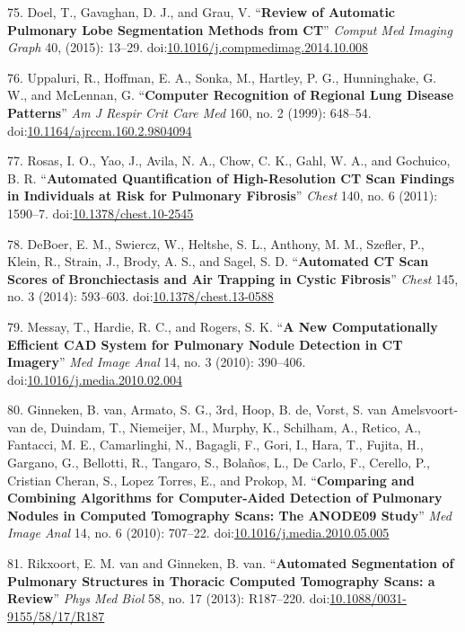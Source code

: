 \documentclass[11pt,]{article}
\begin{document}
75. Doel, T., Gavaghan, D. J., and Grau, V. ``\textbf{Review of
Automatic Pulmonary Lobe Segmentation Methods from CT}'' \emph{Comput
Med Imaging Graph} 40, (2015): 13--29.
doi:\href{http://dx.doi.org/10.1016/j.compmedimag.2014.10.008}{10.1016/j.compmedimag.2014.10.008}

76. Uppaluri, R., Hoffman, E. A., Sonka, M., Hartley, P. G.,
Hunninghake, G. W., and McLennan, G. ``\textbf{Computer Recognition of
Regional Lung Disease Patterns}'' \emph{Am J Respir Crit Care Med} 160,
no. 2 (1999): 648--54.
doi:\href{http://dx.doi.org/10.1164/ajrccm.160.2.9804094}{10.1164/ajrccm.160.2.9804094}

77. Rosas, I. O., Yao, J., Avila, N. A., Chow, C. K., Gahl, W. A., and
Gochuico, B. R. ``\textbf{Automated Quantification of High-Resolution CT
Scan Findings in Individuals at Risk for Pulmonary Fibrosis}''
\emph{Chest} 140, no. 6 (2011): 1590--7.
doi:\href{http://dx.doi.org/10.1378/chest.10-2545}{10.1378/chest.10-2545}

78. DeBoer, E. M., Swiercz, W., Heltshe, S. L., Anthony, M. M., Szefler,
P., Klein, R., Strain, J., Brody, A. S., and Sagel, S. D.
``\textbf{Automated CT Scan Scores of Bronchiectasis and Air Trapping in
Cystic Fibrosis}'' \emph{Chest} 145, no. 3 (2014): 593--603.
doi:\href{http://dx.doi.org/10.1378/chest.13-0588}{10.1378/chest.13-0588}

79. Messay, T., Hardie, R. C., and Rogers, S. K. ``\textbf{A New
Computationally Efficient CAD System for Pulmonary Nodule Detection in
CT Imagery}'' \emph{Med Image Anal} 14, no. 3 (2010): 390--406.
doi:\href{http://dx.doi.org/10.1016/j.media.2010.02.004}{10.1016/j.media.2010.02.004}

80. Ginneken, B. van, Armato, S. G., 3rd, Hoop, B. de, Vorst, S. van
Amelsvoort-van de, Duindam, T., Niemeijer, M., Murphy, K., Schilham, A.,
Retico, A., Fantacci, M. E., Camarlinghi, N., Bagagli, F., Gori, I.,
Hara, T., Fujita, H., Gargano, G., Bellotti, R., Tangaro, S., Bola{ñ}os,
L., De Carlo, F., Cerello, P., Cristian Cheran, S., Lopez Torres, E.,
and Prokop, M. ``\textbf{Comparing and Combining Algorithms for
Computer-Aided Detection of Pulmonary Nodules in Computed Tomography
Scans: The ANODE09 Study}'' \emph{Med Image Anal} 14, no. 6 (2010):
707--22.
doi:\href{http://dx.doi.org/10.1016/j.media.2010.05.005}{10.1016/j.media.2010.05.005}

81. Rikxoort, E. M. van and Ginneken, B. van. ``\textbf{Automated
Segmentation of Pulmonary Structures in Thoracic Computed Tomography
Scans: a Review}'' \emph{Phys Med Biol} 58, no. 17 (2013): R187--220.
doi:\href{http://dx.doi.org/10.1088/0031-9155/58/17/R187}{10.1088/0031-9155/58/17/R187}
\end{document}
